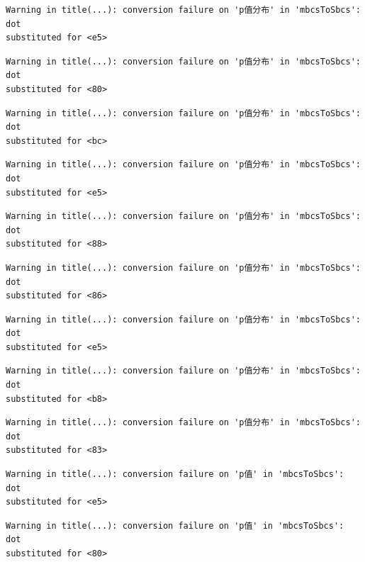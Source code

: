\documentclass[
  letterpaper,
  DIV=11,
  numbers=noendperiod]{scrreprt}
\begin{document}
\begin{verbatim}
Warning in title(...): conversion failure on 'p值分布' in 'mbcsToSbcs': dot
substituted for <e5>
\end{verbatim}

\begin{verbatim}
Warning in title(...): conversion failure on 'p值分布' in 'mbcsToSbcs': dot
substituted for <80>
\end{verbatim}

\begin{verbatim}
Warning in title(...): conversion failure on 'p值分布' in 'mbcsToSbcs': dot
substituted for <bc>
\end{verbatim}

\begin{verbatim}
Warning in title(...): conversion failure on 'p值分布' in 'mbcsToSbcs': dot
substituted for <e5>
\end{verbatim}

\begin{verbatim}
Warning in title(...): conversion failure on 'p值分布' in 'mbcsToSbcs': dot
substituted for <88>
\end{verbatim}

\begin{verbatim}
Warning in title(...): conversion failure on 'p值分布' in 'mbcsToSbcs': dot
substituted for <86>
\end{verbatim}

\begin{verbatim}
Warning in title(...): conversion failure on 'p值分布' in 'mbcsToSbcs': dot
substituted for <e5>
\end{verbatim}

\begin{verbatim}
Warning in title(...): conversion failure on 'p值分布' in 'mbcsToSbcs': dot
substituted for <b8>
\end{verbatim}

\begin{verbatim}
Warning in title(...): conversion failure on 'p值分布' in 'mbcsToSbcs': dot
substituted for <83>
\end{verbatim}

\begin{verbatim}
Warning in title(...): conversion failure on 'p值' in 'mbcsToSbcs': dot
substituted for <e5>
\end{verbatim}

\begin{verbatim}
Warning in title(...): conversion failure on 'p值' in 'mbcsToSbcs': dot
substituted for <80>
\end{verbatim}
\end{document}
